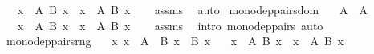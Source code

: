 \begin{isabellebody}
\ \ \ {\isachardoublequoteopen}{\isacharparenleft}{\kern0pt}{\isasymSum}x\ {\isasymin}\ A{\isachardot}{\kern0pt}\ B\ x{\isacharparenright}{\kern0pt}\ {\isasymsubseteq}\ {\isacharparenleft}{\kern0pt}{\isasymSum}x\ {\isasymin}\ A{\isacharprime}{\kern0pt}{\isachardot}{\kern0pt}\ B{\isacharprime}{\kern0pt}\ x{\isacharparenright}{\kern0pt}{\isachardoublequoteclose}\isanewline
%
\isadelimproof
\ \ %
\endisadelimproof
%
\isatagproof
{}\isamarkupfalse%
\ assms\ \isamarkupfalse%
\ auto%
\endisatagproof
{\isafoldproof}%
%
\isadelimproof
\isanewline
%
\endisadelimproof
\isanewline
{}\isamarkupfalse%
\ mono{\isacharunderscore}{\kern0pt}dep{\isacharunderscore}{\kern0pt}pairs{\isacharunderscore}{\kern0pt}dom{\isacharcolon}{\kern0pt}\isanewline
\ \ \ {\isachardoublequoteopen}A\ {\isasymsubseteq}\ A{\isacharprime}{\kern0pt}{\isachardoublequoteclose}\isanewline
\ \ \ {\isachardoublequoteopen}{\isacharparenleft}{\kern0pt}{\isasymSum}x\ {\isasymin}\ A{\isachardot}{\kern0pt}\ B\ x{\isacharparenright}{\kern0pt}\ {\isasymsubseteq}\ {\isacharparenleft}{\kern0pt}{\isasymSum}x\ {\isasymin}\ A{\isacharprime}{\kern0pt}{\isachardot}{\kern0pt}\ B\ x{\isacharparenright}{\kern0pt}{\isachardoublequoteclose}\isanewline
%
\isadelimproof
\ \ %
\endisadelimproof
%
\isatagproof
{}\isamarkupfalse%
\ assms\ \isamarkupfalse%
\ {\isacharparenleft}{\kern0pt}intro\ mono{\isacharunderscore}{\kern0pt}dep{\isacharunderscore}{\kern0pt}pairs{\isacharparenright}{\kern0pt}\ auto%
\endisatagproof
{\isafoldproof}%
%
\isadelimproof
\isanewline
%
\endisadelimproof
\isanewline
{}\isamarkupfalse%
\ mono{\isacharunderscore}{\kern0pt}dep{\isacharunderscore}{\kern0pt}pairs{\isacharunderscore}{\kern0pt}rng{\isacharcolon}{\kern0pt}\isanewline
\ \ \ {\isachardoublequoteopen}{\isasymAnd}x{\isachardot}{\kern0pt}\ x\ {\isasymin}\ A\ {\isasymLongrightarrow}\ B\ x\ {\isasymsubseteq}\ B{\isacharprime}{\kern0pt}\ x{\isachardoublequoteclose}\isanewline
\ \ \ {\isachardoublequoteopen}{\isacharparenleft}{\kern0pt}{\isasymSum}x\ {\isasymin}\ A{\isachardot}{\kern0pt}\ B\ x{\isacharparenright}{\kern0pt}\ {\isasymsubseteq}\ {\isacharparenleft}{\kern0pt}{\isasymSum}x\ {\isasymin}\ A{\isachardot}{\kern0pt}\ {\isacharparenleft}{\kern0pt}B{\isacharprime}{\kern0pt}\ x{\isacharparenright}{\kern0pt}{\isacharparenright}{\kern0pt}{\isachardoublequoteclose}\isanewline
%
\isadelimproof
\ \ %
\endisadelimproof
%
\isatagproof
{}\isamarkupfalse%

\end{isabellebody}
